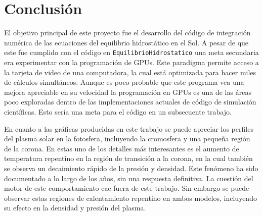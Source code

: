 \section{Conclusión}

El objetivo principal de este proyecto fue el desarrollo del código de
integración numérica de las ecuaciones del equilibrio hidrostático en el Sol. A
pesar de que este fue cumplido con el código en \verb|EquilibrioHidrostatico|
una meta secundaria era experimentar con la programación de GPUs. Este paradigma
permite acceso a la tarjeta de video de una computadora, la cual está optimizada
para hacer miles de cálculos simultáneos. Aunque es poco probable que este
programa vea una mejora apreciable en su velocidad la programación en GPUs es
una de las áreas poco exploradas dentro de las implementaciones actuales de
código de simulación científicas. Esto sería una meta para el código en un
subsecuente trabajo.

En cuanto a las gráficas producidas en este trabajo se puede apreciar los
perfiles del plasma solar en la fotosfera, incluyendo la cromosfera y una
pequeña región de la corona. En estas uno de los detalles más interesantes es el
aumento de temperatura repentino en la región de transición a la corona, en la
cual también se observa un decaimiento rápido de la presión y densidad. Este
fenómeno ha sido documentado a lo largo de los años, sin una respuesta
definitiva. \cite{coronaHeatingProblem} La cuestión del motor de este
comportamiento cae fuera de este trabajo. Sin embargo se puede observar estas
regiones de calentamiento repentino en ambos modelos, incluyendo su efecto en la
densidad y presión del plasma.